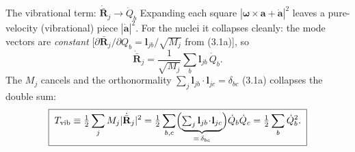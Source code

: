 \documentclass[aspectratio=169,10pt]{beamer}
\newcommand{\stagenum}{0}
\newcommand{\setstage}[1]{\renewcommand{\stagenum}{#1}}
\begin{document}
\begin{frame}{The vibrational term: $\dot{\bar{\mathbf R}}_j\to\dot Q_b$}
\setstage{2}
Expanding each square $|\boldsymbol\omega\!\times\!\mathbf a+\dot{\mathbf a}|^2$ leaves a pure-velocity (\alert{vibrational}) piece $|\dot{\mathbf a}|^2$. For the nuclei it collapses cleanly: the mode vectors are \emph{constant} [$\partial\bar{\mathbf R}_j/\partial Q_b=\mathbf l_{jb}/\sqrt{M_j}$ from (3.1a)], so
\begin{equation*}
\dot{\bar{\mathbf R}}_j=\frac{1}{\sqrt{M_j}}\sum_b\mathbf l_{jb}\,\dot Q_b .
\end{equation*}
The $M_j$ cancels and the orthonormality $\sum_j\mathbf l_{jb}\!\cdot\!\mathbf l_{jc}=\delta_{bc}$ (3.1a) collapses the double sum:
\begin{equation*}
\boxed{\;T_{\mathrm{vib}}\equiv\tfrac12\sum_j M_j|\dot{\bar{\mathbf R}}_j|^2
=\tfrac12\sum_{b,c}\Bigl(\underbrace{\textstyle\sum_j\mathbf l_{jb}\!\cdot\!\mathbf l_{jc}}_{=\,\delta_{bc}}\Bigr)\dot Q_b\dot Q_c
=\tfrac12\sum_b\dot Q_b^2 .\;}
\end{equation*}
\end{frame}
\end{document}
